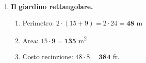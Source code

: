\begin{enumerate}[label=\textbf{\arabic*.}, leftmargin=2em, itemsep=0.8ex]
      \item \textbf{Il giardino rettangolare.}

            \begin{enumerate}[label=\alph*), leftmargin=1.5em]
                  \item Perimetro: $2 \cdot (15 + 9) = 2 \cdot 24 = \mathbf{48}$ m
                  \item Area: $15 \cdot 9 = \mathbf{135}$ m\textsuperscript{2}
                  \item Costo recinzione: $48 \cdot 8 = \mathbf{384}$ fr.
            \end{enumerate}

\end{enumerate}